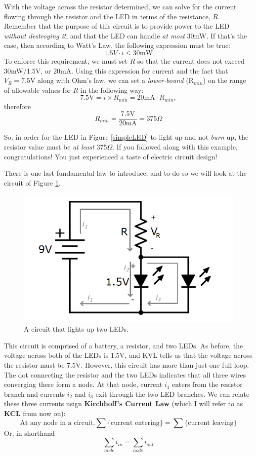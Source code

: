\par
With the voltage across the resistor determined, we can solve for the current flowing through the resistor and the LED in terms of the resistance, $R$. Remember that the purpose of this circuit is to provide power to the LED \textit{without destroying it}, and that the LED can handle \textit{at most} 30mW. If that's the case, then according to Watt's Law, the following expression must be true:
$$
1.5V \cdot i \leq 30\textrm{mW}
$$
To enforce this requirement, we must set $R$ so that the current does not exceed 30mW/1.5V, or 20mA. Using this expression for current and the fact that $V_R=7.5\textrm{V}$ along with Ohm's law, we can set a \textit{lower-bound} (R$_{min}$) on the range of allowable values for $R$ in the following way:
$$
7.5\textrm{V} = i \times R_{min} = 20\textrm{mA} \cdot R_{min},
$$
therefore
$$
R_{min} = \frac{7.5\textrm{V}}{20\textrm{mA}} = 375\Omega
$$
\par
So, in order for the LED in Figure \ref{simpleLED} to light up and not \textit{burn} up, the resistor value must be \textit{at least} 375$\Omega$. If you followed along with this example, congratulations! You just experienced a taste of electric circuit design!
\par
There is one last fundamental law to introduce, and to do so we will look at the circuit of Figure \ref{twoLEDs}.
\begin{figure}[h!]
\centering
\includegraphics[width=12cm]{figures/twoLEDsCircuit.png}
\caption{A circuit that lights up two LEDs.}
\label{twoLEDs}
\end{figure}

This circuit is comprised of a battery, a resistor, and two LEDs. As before, the voltage across both of the LEDs is 1.5V, and KVL tells us that the voltage across the resistor must be 7.5V. However, this circuit has more than just one full loop. The dot connecting the resistor and the two LEDs indicates that all three wires converging there form a node. At that node, current $i_1$ enters from the resistor branch and currents $i_2$ and $i_3$ exit through the two LED branches. We can relate these three currents usign \textbf{Kirchhoff's Current Law} (which I will refer to as \textbf{KCL} from now on): 
$$
\textrm{At any node in a circuit,} \sum\textrm{\{current entering\}} = \sum\textrm{\{current leaving\}}
$$
Or, in shorthand
$$
\sum_{node}i_{in} = \sum_{node}i_{out}
$$

